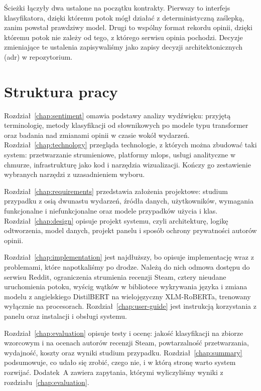 
Ścieżki łączyły dwa ustalone na początku kontrakty.
Pierwszy to interfejs klasyfikatora, dzięki któremu potok mógł działać z deterministyczną zaślepką, zanim powstał prawdziwy model.
Drugi to wspólny format rekordu opinii, dzięki któremu potok nie zależy od tego, z którego serwisu opinia pochodzi.
Decyzje zmieniające te ustalenia zapisywaliśmy jako zapisy decyzji architektonicznych (\ac{adr}) w repozytorium.

\section{Struktura pracy}
\label{sec:intro-structure}

Rozdział~\ref{chap:sentiment} omawia podstawy analizy wydźwięku: przyjętą terminologię, metody klasyfikacji od słownikowych po modele typu transformer oraz badania nad zmianami opinii w czasie wokół wydarzeń.
Rozdział~\ref{chap:technology} przegląda technologie, z których można zbudować taki system: przetwarzanie strumieniowe, platformy \ac{mlops}, usługi analityczne w chmurze, infrastrukturę jako kod i narzędzia wizualizacji.
Kończy go zestawienie wybranych narzędzi z uzasadnieniem wyboru.

Rozdział~\ref{chap:requirements} przedstawia założenia projektowe: studium przypadku z osią dwunastu wydarzeń, źródła danych, użytkowników, wymagania funkcjonalne i niefunkcjonalne oraz modele przypadków użycia i klas.
Rozdział~\ref{chap:design} opisuje projekt systemu, czyli architekturę, logikę odtworzenia, model danych, projekt panelu i sposób ochrony prywatności autorów opinii.

Rozdział~\ref{chap:implementation} jest najdłuższy, bo opisuje implementację wraz z problemami, które napotkaliśmy po drodze.
Należą do nich odmowa dostępu do serwisu Reddit, ograniczenia strumienia recenzji Steam, cztery nieudane uruchomienia potoku, wyścig wątków w bibliotece wykrywania języka i zmiana modelu z angielskiego DistilBERT na wielojęzyczny XLM-RoBERTa, trenowany wyłącznie na procesorach.
Rozdział~\ref{chap:user-guide} jest instrukcją korzystania z panelu oraz instalacji i obsługi systemu.

Rozdział~\ref{chap:evaluation} opisuje testy i ocenę: jakość klasyfikacji na zbiorze wzorcowym i na ocenach autorów recenzji Steam, powtarzalność przetwarzania, wydajność, koszty oraz wyniki studium przypadku.
Rozdział~\ref{chap:summary} podsumowuje, co udało się zrobić, czego nie, i w którą stronę warto system rozwijać.
Dodatek~A zawiera zapytania, którymi wyliczyliśmy wyniki z rozdziału~\ref{chap:evaluation}.
